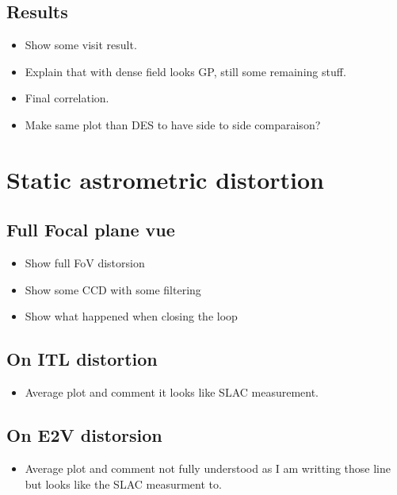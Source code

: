 \subsection{Results}

\begin{itemize}
    \item Show some visit result.
    \item Explain that with dense field looks GP, still some remaining stuff. 
    \item Final correlation.
    \item Make same plot than DES to have side to side comparaison? 
\end{itemize}

\section{Static astrometric distortion}


\subsection{Full Focal plane vue}

\begin{itemize}
    \item Show full FoV distorsion
    \item Show some CCD with some filtering
    \item Show what happened when closing the loop
\end{itemize}

\subsection{On ITL distortion}

\begin{itemize}
    \item Average plot and comment it looks like SLAC measurement. 
\end{itemize}

\subsection{On E2V distorsion}

\begin{itemize}
    \item Average plot and comment not fully understood as I am writting those line but looks like the SLAC measurment to. 
\end{itemize}



